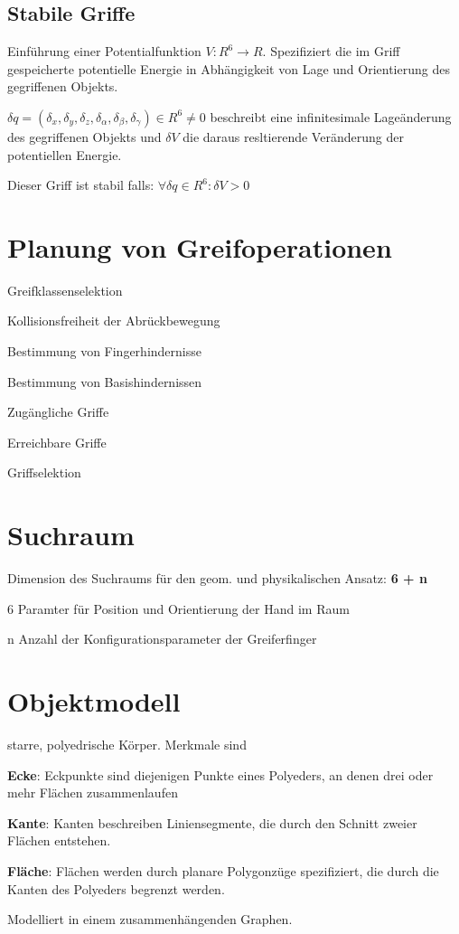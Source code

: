 \subsection{Stabile Griffe}
\begin{compactitem}
    \item Einführung einer Potentialfunktion $V: R^6 \rightarrow R$. Spezifiziert die im Griff gespeicherte
    potentielle Energie in Abhängigkeit von Lage und Orientierung des gegriffenen Objekts.
    \item $\delta q= (\delta_x, \delta_y, \delta_z, \delta_\alpha, \delta_\beta, \delta_\gamma) \in
    R^6 \neq 0$ beschreibt eine infinitesimale Lageänderung des gegriffenen Objekts und $\delta V$ die daraus
    resltierende Veränderung der potentiellen Energie.
    \item Dieser Griff ist stabil falls: $\forall \delta q \in R^6: \delta V > 0$
\end{compactitem}
\section{Planung von Greifoperationen}
\begin{compactenum}
    \item Greifklassenselektion
    \item Kollisionsfreiheit der Abrückbewegung
    \item Bestimmung von Fingerhindernisse
    \item Bestimmung von Basishindernissen
    \item Zugängliche Griffe
    \item Erreichbare Griffe
    \item Griffselektion
\end{compactenum}
\section{Suchraum}
Dimension des Suchraums für den geom. und physikalischen Ansatz: \textbf{6 + n}
\begin{compactitem}
    \item 6 Paramter für Position und Orientierung der Hand im Raum
    \item n Anzahl der Konfigurationsparameter der Greiferfinger
\end{compactitem}
\section{Objektmodell}
starre, polyedrische Körper. Merkmale sind
\begin{compactitem}
    \item \textbf{Ecke}: Eckpunkte sind diejenigen Punkte eines Polyeders, an denen drei oder mehr
    Flächen zusammenlaufen
    \item \textbf{Kante}: Kanten beschreiben Liniensegmente, die durch den Schnitt zweier Flächen
    entstehen.
    \item \textbf{Fläche}: Flächen werden durch planare Polygonzüge spezifiziert, die durch die Kanten
    des Polyeders begrenzt werden.
\end{compactitem}
Modelliert in einem zusammenhängenden Graphen.
